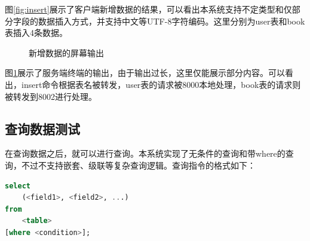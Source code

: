图\ref{fig:insert}展示了客户端新增数据的结果，可以看出本系统支持不定类型和仅部分字段的数据插入方式，并支持中文等UTF-8字符编码。这里分别为user表和book表插入4条数据。

\begin{figure}[H]
    \centering
    \caption{新增数据的屏幕输出}
    \label{fig:insert-log}
\end{figure}

图\ref{fig:insert-log}展示了服务端终端的输出，由于输出过长，这里仅能展示部分内容。可以看出，insert命令根据表名被转发，user表的请求被8000本地处理，book表的请求则被转发到8002进行处理。

\subsection{查询数据测试}

在查询数据之后，就可以进行查询。本系统实现了无条件的查询和带where的查询，不过不支持嵌套、级联等复杂查询逻辑。查询指令的格式如下：

\begin{lstlisting}[language=sql]
select
    (<field1>, <field2>, ...)
from
    <table>
[where <condition>];
\end{lstlisting}

